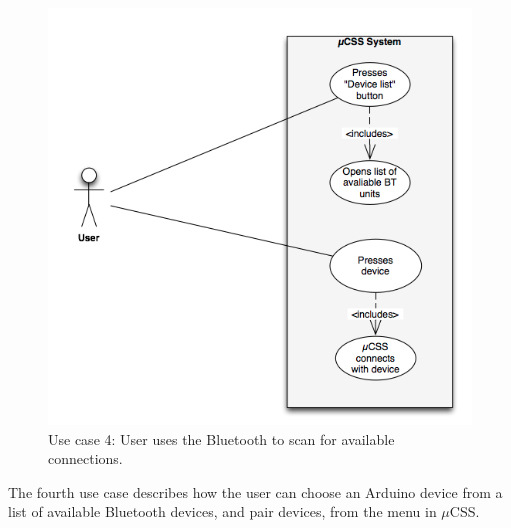 \begin{figure}[H]
\centering
\includegraphics[scale=0.7]{images/UseCase7}
\caption[Use case 4]{Use case 4: User uses the Bluetooth to scan for available connections.}
\end{figure}

The fourth use case describes how the user can choose an Arduino device from a list of available Bluetooth devices, and pair devices, from the menu in $\mu$CSS. 

